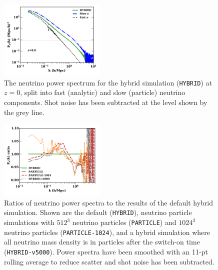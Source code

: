 \documentclass[useAMS, usenatbib]{mnras}
\begin{document}
\begin{figure}
\includegraphics[width=0.45\textwidth]{nuplots/pks-nu-split-1.pdf}
  \caption{The neutrino power spectrum for the hybrid simulation (\texttt{HYBRID}) at $z=0$, split into fast (analytic) and slow (particle) neutrino components. Shot noise has been subtracted at the level shown by the grey line.}
  \label{fig:neutrino_power_split}
\end{figure}

\begin{figure}
  \includegraphics[width=0.45\textwidth]{nuplots/pks_nu_ckrel2-1.pdf}
    \caption{Ratios of neutrino power spectra to the results of the default hybrid simulation. Shown are the default (\texttt{HYBRID}), neutrino particle simulations with $512^3$ neutrino particles (\texttt{PARTICLE}) and $1024^3$ neutrino particles (\texttt{PARTICLE-1024}), and a hybrid simulation where all neutrino mass density is in particles after the switch-on time (\texttt{HYBRID-v5000}). Power spectra have been smoothed with an 11-pt rolling average to reduce scatter and shot noise has been subtracted.}
  \label{fig:hybparticle}
\end{figure}
\end{document}

